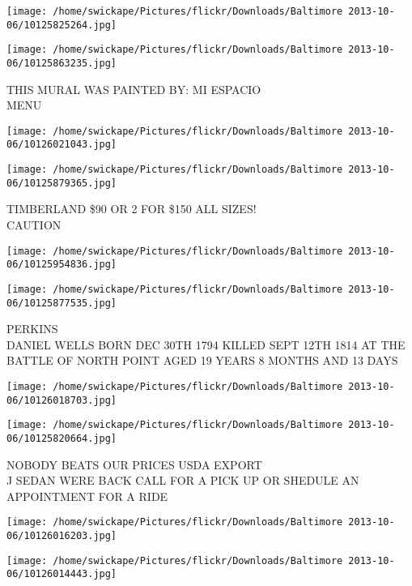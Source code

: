 \documentclass[10pt,letterpaper]{article}
\begin{document}
\texttt{[image: /home/swickape/Pictures/flickr/Downloads/Baltimore 2013-10-06/10125825264.jpg]}

\vspace{0.25in}
\texttt{[image: /home/swickape/Pictures/flickr/Downloads/Baltimore 2013-10-06/10125863235.jpg]}

THIS MURAL WAS PAINTED BY: MI ESPACIO\\
MENU\\
\pagebreak

\texttt{[image: /home/swickape/Pictures/flickr/Downloads/Baltimore 2013-10-06/10126021043.jpg]}

\vspace{0.25in}
\texttt{[image: /home/swickape/Pictures/flickr/Downloads/Baltimore 2013-10-06/10125879365.jpg]}

TIMBERLAND \$90 OR 2 FOR \$150 ALL SIZES!\\
CAUTION\\
\pagebreak

\texttt{[image: /home/swickape/Pictures/flickr/Downloads/Baltimore 2013-10-06/10125954836.jpg]}

\vspace{0.25in}
\texttt{[image: /home/swickape/Pictures/flickr/Downloads/Baltimore 2013-10-06/10125877535.jpg]}

PERKINS\\
DANIEL WELLS BORN DEC 30TH 1794 KILLED SEPT 12TH 1814 AT THE BATTLE OF NORTH POINT AGED 19 YEARS 8 MONTHS AND 13 DAYS\\
\pagebreak

\texttt{[image: /home/swickape/Pictures/flickr/Downloads/Baltimore 2013-10-06/10126018703.jpg]}

\vspace{0.25in}
\texttt{[image: /home/swickape/Pictures/flickr/Downloads/Baltimore 2013-10-06/10125820664.jpg]}

NOBODY BEATS OUR PRICES USDA EXPORT\\
J SEDAN WERE BACK CALL FOR A PICK UP OR SHEDULE AN APPOINTMENT FOR A RIDE\\
\pagebreak

\texttt{[image: /home/swickape/Pictures/flickr/Downloads/Baltimore 2013-10-06/10126016203.jpg]}

\vspace{0.25in}
\texttt{[image: /home/swickape/Pictures/flickr/Downloads/Baltimore 2013-10-06/10126014443.jpg]}
\end{document}
